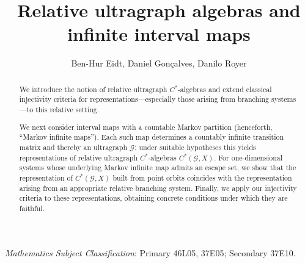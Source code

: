 \documentclass[12pt, reqno]{amsart}
\theoremstyle{definition}
\theoremstyle{remark}
\numberwithin{equation}{section}
\begin{document}
\title[Relative ultragraph algebras and infinite interval maps]{Relative ultragraph algebras and infinite interval maps}
   
 \author{Ben-Hur Eidt, Daniel Gon\c{c}alves, Danilo Royer}


\address{Instituto de Ciências Matemáticas e de Computação, Universidade de São Paulo, São Carlos, 13566-590\\
 Brazil}
 
\address{Departamento de Matem\'atica,
Universidade Federal de Santa Catarina,
Florian\'opolis, 88040-900\\
 Brazil}

\address{Departamento de Matem\'atica,
Universidade Federal de Santa Catarina,
Florian\'opolis, 88040-900\\
 Brazil}
   
     
 
\begin{abstract}

We introduce the notion of relative ultragraph $C^*$-algebras and extend classical injectivity criteria for representations—especially those arising from branching systems—to this relative setting.

We next consider interval maps with a countable Markov partition (henceforth, “Markov infinite maps”). Each such map determines a countably infinite transition matrix and thereby an ultragraph $\mathcal{G}$; under suitable hypotheses this yields representations of  relative ultragraph $C^*$-algebras $C^*(\mathcal{G},X)$. For one-dimensional systems whose underlying Markov infinite map admits an escape set, we show that the representation of $C^*(\mathcal{G},X)$ built from point orbits coincides with the representation arising from an appropriate relative branching system.
Finally, we apply our injectivity criteria to these representations, obtaining concrete conditions under which they are faithful.



\end{abstract}

\maketitle

{\it Mathematics Subject Classification}: Primary 46L05, 37E05;
Secondary 37E10.
\end{document}
